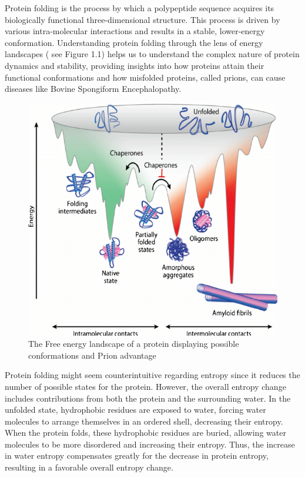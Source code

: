 \documentclass[a4paper,english,12pt,bibliography=totoc]{scrreprt}
\begin{document}
Protein folding is the process by which a polypeptide sequence acquires its biologically functional three-dimensional structure. This process is driven by various intra-molecular interactions and results in a stable, lower-energy conformation. Understanding protein folding through the lens of energy landscapes ( see Figure 1.1) helps us to understand the complex nature of protein dynamics and stability, providing insights into how proteins attain their functional conformations and how misfolded proteins, called prions, can cause diseases like Bovine Spongiform Encephalopathy.

\begin{figure}[H]
    \centering
    \includegraphics[width=0.5\linewidth]{Energy-landscape-of-protein-folding-and-misfolding-From-the-unfolded-state-toward-the.png}
    \caption{The Free energy landscape of a protein displaying possible conformations and Prion advantage \cite{muntau_innovative_2014}}
    \label{fig:enter-label}
\end{figure}

Protein folding might seem counterintuitive regarding entropy since it reduces the number of possible states for the protein. However, the overall entropy change includes contributions from both the protein and the surrounding water. In the unfolded state, hydrophobic residues are exposed to water, forcing water molecules to arrange themselves in an ordered shell, decreasing their entropy. When the protein folds, these hydrophobic residues are buried, allowing water molecules to be more disordered and increasing their entropy. Thus, the increase in water entropy compensates greatly for the decrease in protein entropy, resulting in a favorable overall entropy change.\\
\end{document}
